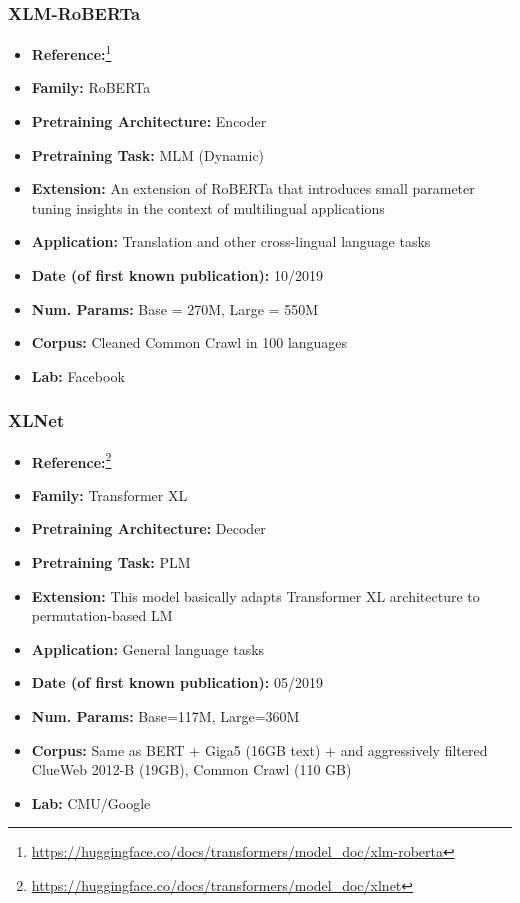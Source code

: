 \documentclass{article}
\begin{document}
\subsubsection{XLM-RoBERTa}

            \begin{itemize}
                \item \textbf{Reference:}\footnote{\url{https://huggingface.co/docs/transformers/model_doc/xlm-roberta}}\cite{conneau2019unsupervised}
                \item \textbf{Family:} RoBERTa
                \item \textbf{Pretraining Architecture:} Encoder
                \item \textbf{Pretraining Task:} MLM (Dynamic)
                \item \textbf{Extension:} An extension of RoBERTa that introduces small parameter tuning insights in the context of multilingual applications
                \item \textbf{Application:} Translation and other cross-lingual language tasks
                \item \textbf{Date (of first known publication):} 10/2019
                \item \textbf{Num. Params:} Base = 270M, Large = 550M
                \item \textbf{Corpus:} Cleaned Common Crawl in 100 languages
                \item \textbf{Lab:} Facebook
            \end{itemize}

\subsubsection{XLNet}

            \begin{itemize}
                \item \textbf{Reference:}\footnote{\url{https://huggingface.co/docs/transformers/model_doc/xlnet}}\cite{yang2019xlnet}
                \item \textbf{Family:} Transformer XL
                \item \textbf{Pretraining Architecture:} Decoder
                \item \textbf{Pretraining Task:} PLM
                \item \textbf{Extension:} This model basically adapts Transformer XL architecture to permutation-based LM
                \item \textbf{Application:} General language tasks
                \item \textbf{Date (of first known publication):} 05/2019
                \item \textbf{Num. Params:} Base=117M, Large=360M
                \item \textbf{Corpus:} Same as BERT + Giga5 (16GB text) + and aggressively filtered ClueWeb 2012-B (19GB), Common Crawl (110 GB)
                \item \textbf{Lab:} CMU/Google
            \end{itemize}
\end{document}
